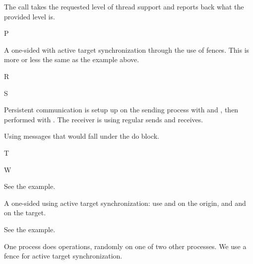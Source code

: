 
The  call takes the requested level of thread support
and reports back what the provided level is.
%

 {P}


A one-sided  with active target synchronization
through the use of fences. This is more or less the same as the
 example above.
%
%

 {R}

 {S}


Persistent communication is setup up on the sending process with
 and , then
performed with . The receiver is using
regular sends and receives.
%
%


Using  messages that would fall under the
 do block.
%

 {T}

 {W}


See the  example.


A one-sided  using active target synchronization:
use  and 
on the origin, and  and
 on the target.
%


See the  example.


One process does  operations, randomly on one of
two other processes. We use a fence for active target synchronization.
%
